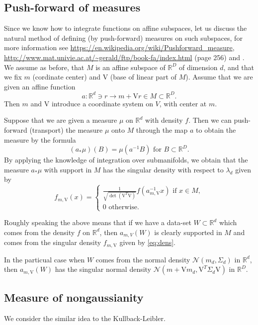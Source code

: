 \documentclass[12pt]{article}
\def\R{\mathbb{R}}
\def\v{\mathrm{V}}
\def\nor{\mathcal{N}}
\theoremstyle{definition}
\begin{document}
\subsection{Push-forward of measures}

Since we know how to integrate functions on affine subspaces, let us discuss the
natural method of defining (by push-forward) measures on such subspaces,
for more information see \url{https://en.wikipedia.org/wiki/Pushforward_measure},
\url{http://www.mat.univie.ac.at/~gerald/ftp/book-fa/index.html} (page 256) and
\cite{bogachev2007measure}. We assume as before, that 
$M$ is an affine subspace of $\R^D$ of dimension $d$, and that we fix $m$ (cordinate center) and $\v$ (base of linear part of $M$).
Assume that we are given an affine function
$$
a: \R^d \ni r \to m+\v r \in M \subset \R^D.
$$
Then $m$ and $\v$ introduce a coordinate system on $V$, with center at $m$. 

Suppose that we are given a measure $\mu$ on $\R^d$ with density $f$. Then
we can push-forward (transport) the measure $\mu$ onto $M$ through the map $a$ to obtain the measure by the formula
$$
(a_* \mu)(B)=\mu(a^{-1}B) \text{ for } B \subset \R^D.
$$
By applying the knowledge of integration over submanifolds, we obtain that 
the measure $a_* \mu$ with support in $M$ has the singular density with respect to $\lambda_d$ given by
\begin{equation} \label{eq:dens}
f_{m,\v}(x)= 
\begin{cases}
\frac{1}{\sqrt{\det(\v^T\v)}}
 f(a_{m,\v}^{-1}x) \text{ if } x \in M, \\
 0 \text{ otherwise}.
 \end{cases}
\end{equation}

Roughly speaking the above means that if we have a data-set $W \subset \R^d$ which comes from the density $f$ on $\R^d$, then $a_{m,V}(W)$ is clearly supported in $M$ and comes from the singular density $f_{m,\v}$ given by 
\eqref{eq:dens}.

In the particual case when $W$ comes from the normal density $\nor(m_d,\Sigma_d)$ in $\R^d$, then $a_{m,\v}(W)$ has the singular normal density $\nor(m+\v m_d,\v^T \Sigma_d \v )$ in $\R^D$.


\subsection{Measure of nongaussianity}

We consider the similar idea to the Kullback-Leibler.
\end{document}
